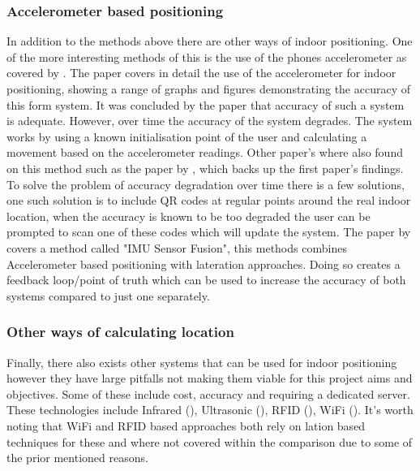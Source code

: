 \subsubsection{Accelerometer based positioning}
In addition to the methods above there are other ways of indoor positioning. One of the more interesting methods of this is the use of the phones accelerometer as covered by \cite{nagpalparamvirsingh_2013_indoor}. The paper covers in detail the use of the accelerometer for indoor positioning, showing a range of graphs and figures demonstrating the accuracy of this form system. It was concluded by the paper that accuracy of such a system is adequate. However, over time the accuracy of the system degrades. The system works by using a known initialisation point of the user and calculating a movement based on the accelerometer readings. Other paper's where also found on this method such as the paper by \cite{palma_2017_evolution}, which backs up the first paper's findings. To solve the problem of accuracy degradation over time there is a few solutions, one such solution is to include QR codes at regular points around the real indoor location, when the accuracy is known to be too degraded the user can be prompted to scan one of these codes which will update the system. The paper by \cite{comer_uwb_vs_ble} covers a method called "IMU Sensor Fusion", this methods combines Accelerometer based positioning with lateration approaches. Doing so creates a feedback loop/point of truth which can be used to increase the accuracy of both systems compared to just one separately.

\subsubsection{Other ways of calculating location}
Finally, there also exists other systems that can be used for indoor positioning however they have large pitfalls not making them viable for this project aims and objectives. Some of these include cost, accuracy and requiring a dedicated server. These technologies include Infrared (\cite{palma_2017_evolution}), Ultrasonic (\cite{qi_2017_a}), RFID (\cite{kim_2013_rfidbased}), WiFi (\cite{duyuanfeng_2016_flexible}). It's worth noting that WiFi and RFID based approaches both rely on lation based techniques for these and where not covered within the comparison due to some of the prior mentioned reasons.
